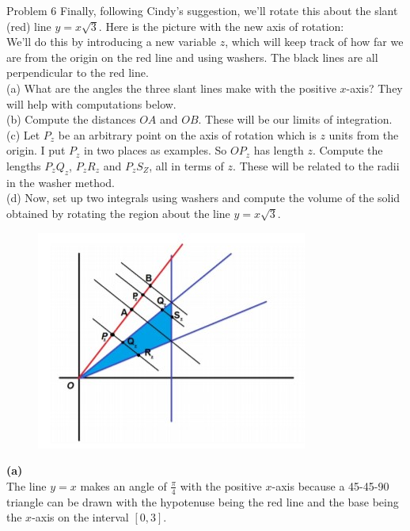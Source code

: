 \documentclass{article}
\begin{document}
    \begin{tbhtheorem}{Problem 6}
        Finally, following Cindy's suggestion, we'll rotate this about the slant (red) line $y=x\sqrt{3}$. Here is the picture with the new axis of rotation: \\

        We'll do this by introducing a new variable $z$, which will keep track of how far we are from the origin on the red line and using washers. The black lines are all perpendicular to the red line. \\
        (a) What are the angles the three slant lines make with the positive $x$-axis? They will help with computations below. \\
        (b) Compute the distances $OA$ and $OB$. These will be our limits of integration. \\
        (c) Let $P_z$ be an arbitrary point on the axis of rotation which is $z$ units from the origin. I put $P_z$ in two places as examples. So $OP_z$ has length $z$. Compute the lengths $P_z Q_z$, $P_z R_z$ and
        $P_z S_Z$, all in terms of $z$. These will be related to the radii in the washer method. \\
        (d) Now, set up two integrals using washers and compute the volume of the solid obtained by rotating the region about the line $y=x\sqrt{3}$.
    \end{tbhtheorem}

    \begin{figure}[hbt!]
        \centering
        \includegraphics[]{slant}
    \end{figure}

    \textbf{(a)} \\
    The line $y=x$ makes an angle of $\frac{\pi}{4}$ with the positive $x$-axis because a 45-45-90 triangle can be drawn with the hypotenuse being the red line and the base being the $x$-axis on the interval $[0,3]$. \\
\end{document}
